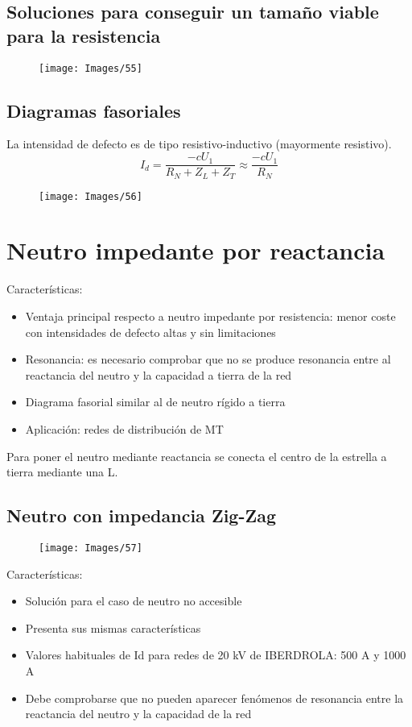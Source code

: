 \subsection{Soluciones para conseguir un tamaño viable para la resistencia}
\begin{figure}[H]
	\centering
	\texttt{[image: Images/55]}
	\label{fig:55}
\end{figure}
\subsection{Diagramas fasoriales}
La intensidad de defecto es de tipo resistivo-inductivo (mayormente resistivo).
\begin{equation}
	I_d=\dfrac{-cU_1}{R_N+Z_L+Z_T}\approx\dfrac{-cU_1}{R_N}
\end{equation}
\begin{figure}[H]
	\centering
	\texttt{[image: Images/56]}
	\label{fig:56}
\end{figure}

\section{Neutro impedante por reactancia}
Características:
\begin{itemize}
	\item Ventaja principal respecto a neutro impedante por resistencia: menor coste con intensidades de defecto altas y sin limitaciones
	\item Resonancia: es necesario comprobar que no se produce resonancia entre al reactancia del neutro y la capacidad a tierra de la red
	\item Diagrama fasorial similar al de neutro rígido a tierra
	\item Aplicación: redes de distribución de MT
\end{itemize}

Para poner el neutro mediante reactancia se conecta el centro de la estrella a tierra mediante una L.
\subsection{Neutro con impedancia Zig-Zag}
\begin{figure}[H]
	\centering
	\texttt{[image: Images/57]}
	\label{fig:57}
\end{figure}
Características:
\begin{itemize}
	\item Solución para el caso de neutro no accesible
	\item Presenta sus mismas características
	\item Valores habituales de Id para redes de 20 kV de IBERDROLA: 500 A y 1000 A
	\item Debe comprobarse que no pueden aparecer fenómenos de resonancia entre la reactancia del neutro y la capacidad de la red
\end{itemize}
\newpage
